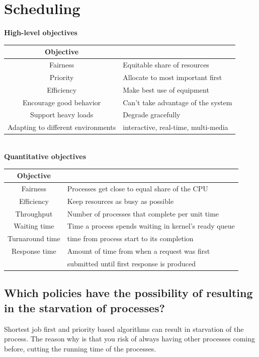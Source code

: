 \documentclass[a4paper]{article}
\begin{document}
\section{Scheduling} %
\label{sec:Scheduling}
{\bf High-level objectives} \\
\begin{tabular}{| c | l |}
  \hline
  {\bf Objective} & \\
  \hline
  Fairness & Equitable share of resources \\
  Priority & Allocate to most important first \\
  Efficiency & Make best use of equipment \\ 
  Encourage good behavior & Can't take advantage of the system \\
  Support heavy loads & Degrade gracefully \\
  Adapting to different environments & interactive, real-time, multi-media  \\
  \hline
\end{tabular}
\\
{\bf Quantitative objectives} \\
\begin{tabular}{| c | l |}
  \hline
  {\bf Objective} & \\
  \hline
  Fairness & Processes get close to equal share of the CPU \\
  Efficiency & Keep resources as busy as possible \\
  Throughput & Number of processes that complete per unit time \\
  Waiting time & Time a process spends waiting in kernel's ready queue \\
  Turnaround time & time from process start to its completion \\
  Response time & Amount of time from when a request was first \\
                & submitted until first response is produced \\
  \hline
\end{tabular}


\subsection{Which policies have the possibility of resulting in the starvation of processes?} %
\label{sub:Which policies have the possibility of resulting in the starvation of processes?}
Shortest job first and priority based algorithms can result in starvation of the process. The reason why is that you risk of 
always having other processes coming before, cutting the running time of the processes.
\end{document}
